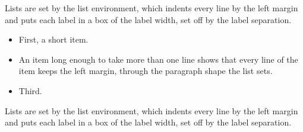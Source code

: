 \documentclass{article}
\begin{document}
Lists are set by the list environment, which indents every line by the left margin and puts each label in a box of the label width, set off by the label separation.

\begin{itemize}
  \item First, a short item.
  \item An item long enough to take more than one line shows that every line of the item keeps the left margin, through the paragraph shape the list sets.
  \item Third.
\end{itemize}

Lists are set by the list environment, which indents every line by the left margin and puts each label in a box of the label width, set off by the label separation.
\end{document}
